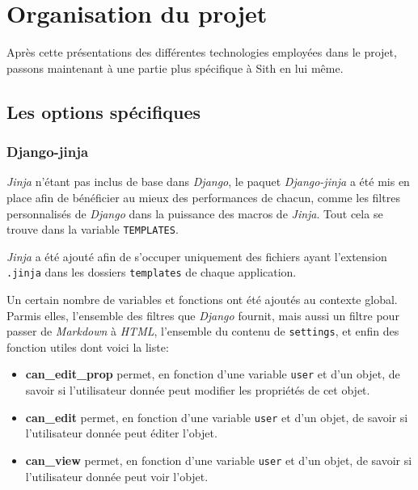 \documentclass[a4paper]{report}
\begin{document}
\chapter{Organisation du projet}
\label{cha:organisation_du_projet}

\par Après cette présentations des différentes technologies employées dans le projet, passons maintenant à une partie plus
spécifique à Sith en lui même.

\section{Les options spécifiques}
\label{sec:les_options_sp_cifiques}

\subsection{Django-jinja}
\label{sub:django_jinja}
\par \emph{Jinja} n'étant pas inclus de base dans \emph{Django}, le paquet \emph{Django-jinja} a été mis en place afin
de bénéficier au mieux des performances de chacun, comme les filtres personnalisés de \emph{Django} dans la puissance des
macros de \emph{Jinja}. Tout cela se trouve dans la variable \verb#TEMPLATES#.
\par \emph{Jinja} a été ajouté afin de s'occuper uniquement des fichiers ayant l'extension \verb#.jinja# dans les
dossiers \verb#templates# de chaque application.
\par Un certain nombre de variables et fonctions ont été ajoutés au contexte global. Parmis elles, l'ensemble des
filtres que \emph{Django} fournit, mais aussi un filtre pour passer de \emph{Markdown} à \emph{HTML}, l'ensemble du
contenu de \verb#settings#, et enfin des fonction utiles dont voici la liste:
\begin{itemize}
    \item \textbf{can\_edit\_prop} permet, en fonction d'une variable \verb#user# et d'un objet, de savoir si
        l'utilisateur donnée peut modifier les propriétés de cet objet.
    \item \textbf{can\_edit} permet, en fonction d'une variable \verb#user# et d'un objet, de savoir si
        l'utilisateur donnée peut éditer l'objet.
    \item \textbf{can\_view} permet, en fonction d'une variable \verb#user# et d'un objet, de savoir si
        l'utilisateur donnée peut voir l'objet.
\end{itemize}
\end{document}
